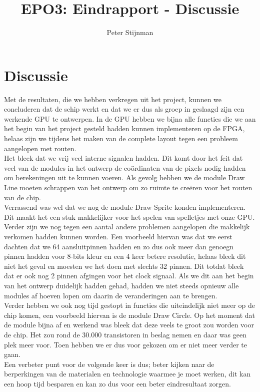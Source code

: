 \documentclass{scrartcl} %
\author{Peter Stijnman}
\title{EPO3: Eindrapport - Discussie}
\begin{document}
\chapter{Discussie}
\label{ch:discussie}

Met de resultaten, die we hebben verkregen uit het project, kunnen we concluderen dat de schip werkt en dat we er dus als groep in geslaagd zijn een werkende GPU te ontwerpen. In de GPU hebben we bijna alle functies die we aan het begin van het project gesteld hadden kunnen implementeren op de FPGA, helaas zijn we tijdens het maken van de complete layout tegen een probleem aangelopen met routen.\\
Het bleek dat we vrij veel interne signalen hadden. Dit komt door het feit dat veel van de modules in het ontwerp de coördinaten van de pixels nodig hadden om berekeningen uit te kunnen voeren.  Als gevolg hebben we de module Draw Line moeten schrappen van het ontwerp om zo ruimte te creëren voor het routen van de chip.\\
Verrassend was wel dat we nog de module Draw Sprite konden implementeren. Dit maakt het een stuk makkelijker voor het spelen van spelletjes met onze GPU.\\
Verder zijn we nog tegen een aantal andere problemen aangelopen die makkelijk verkomen hadden kunnen worden. Een voorbeeld hiervan was dat we eerst dachten dat we 64 aansluitpinnen hadden en zo dus ook meer dan genoegn pinnen hadden voor 8-bits kleur en een 4 keer betere resolutie, helaas bleek dit niet het geval en moesten we het doen met slechts 32 pinnen. Dit totdat bleek dat er ook nog 2 pinnen afgingen voor het clock signaal. Als we dit aan het begin van het ontwerp duidelijk hadden gehad, hadden we niet steeds opnieuw alle modules af hoeven lopen om daarin de veranderingen aan te brengen.\\
Verder hebben we ook nog tijd gestopt in functies die uiteindelijk niet meer op de chip komen, een voorbeeld hiervan is de module Draw Circle. Op het moment dat de module bijna af en werkend was bleek dat deze veels te groot zou worden voor de chip. Het zou rond de 30.000 transistoren in beslag nemen en daar was geen plek meer voor. Toen hebben we er dus voor gekozen om er niet meer verder te gaan.\\
Een verbeter punt voor de volgende keer is dus; beter kijken naar de berperkingen van de materialen en technologie waarmee je moet werken, dit kan een hoop tijd besparen en kan zo dus voor een beter eindresultaat zorgen.
\end{document}
